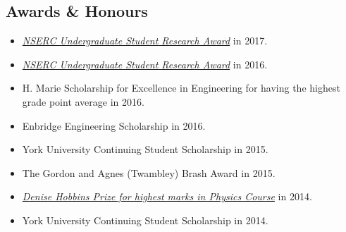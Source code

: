 \documentclass[margin, centered]{res}
\begin{document}
\begin{resume}
		\section{Awards \& Honours}
		\begin{itemize}[leftmargin=*]
			\item  \href{http://www.lassondeundergraduateresearch.com/electricalandcomputer#/new-page-s6yt8/}{\emph{NSERC Undergraduate Student Research Award}} in 2017.
			\item  \href{http://www.lassondeundergraduateresearch.com/lassonde#/amanpreet-walia/}{\emph{NSERC Undergraduate Student Research Award}} in 2016.
			\item
			H. Marie Scholarship for Excellence in Engineering for having the highest grade point average in 2016.
			\item
			Enbridge Engineering Scholarship in 2016.
			\item
			York University Continuing Student Scholarship in 2015.
			\item
			The Gordon and Agnes (Twambley) Brash Award in 2015.
			\item
			\href{http://physics.info.yorku.ca/undergraduate-studies/undergraduate-awards/departmental-awards/#a2}{\emph{Denise Hobbins Prize for highest marks in Physics Course}} in 2014.
			\item
			York University Continuing Student Scholarship in 2014.
			
			
		\end{itemize}
		
	\end{resume}
	
	
	
	
	
	
\end{document}
